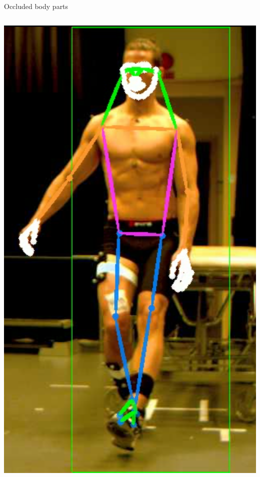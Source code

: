 \begin{frame}[fragile]{Occluded body parts}
\begin{columns}[T,onlytextwidth]
      \includegraphics[height=0.74\textheight]{files/figs/res/hpe/36-7.png}
  \end{columns}
\end{frame}

